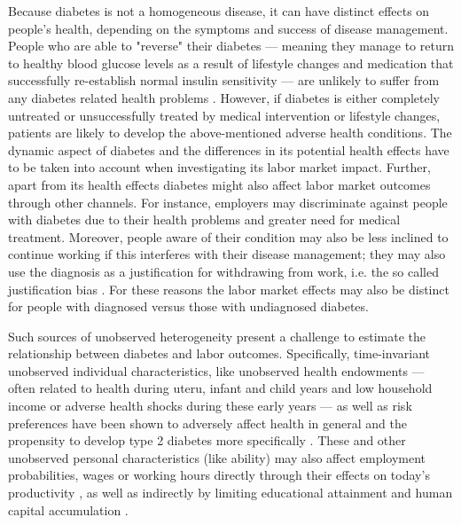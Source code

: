 \documentclass[12pt,english,british]{article}
\begin{document}
Because diabetes is not a homogeneous disease, it can have distinct effects on people's health, depending on the symptoms and success of disease management. People who are able to "reverse" their diabetes --- meaning they manage to return to healthy blood glucose levels as a result of lifestyle changes and medication that successfully re-establish normal insulin sensitivity --- are unlikely to suffer from any diabetes related health problems \citep{Lim2011, Gregg2012}.
However, if diabetes is either completely untreated or unsuccessfully treated by medical intervention or lifestyle changes, patients are likely to develop the above-mentioned adverse health conditions. The dynamic  aspect of diabetes and the differences in its potential health effects have to be taken into account when investigating its labor market impact. Further, apart from its health effects diabetes might also affect labor market outcomes through other channels. For instance, employers may discriminate against people with diabetes due to their health problems and greater need for medical treatment. Moreover, people aware of their condition may also be less inclined to continue working if this interferes with their disease management; they may also use the diagnosis as a justification for withdrawing from work, i.e. the so called justification bias \citep{Kapteyn2009}. For these reasons the labor market effects may also be distinct for people with diagnosed versus those with undiagnosed diabetes. 

Such sources of unobserved heterogeneity present a challenge to estimate the relationship between diabetes and labor outcomes. Specifically, time-invariant unobserved individual characteristics, like unobserved health endowments --- often related to health during uteru, infant and child years and low household income or adverse health shocks during these early years --- as well as risk preferences have been shown to adversely affect health in general and the propensity to develop type 2 diabetes more specifically \citep{VanEwijk2011,Sotomayor2013,Li2010b}. These and other unobserved personal characteristics (like ability) may also affect employment probabilities, wages or working hours directly through their effects on today's productivity \citep{Currie2013}, as well as indirectly by limiting educational attainment and human capital accumulation \citep{Ayyagari2011a}.
\end{document}
